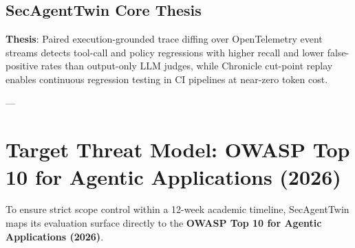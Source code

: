\documentclass[11pt,a4paper]{article}
\begin{document}
\subsection{SecAgentTwin Core Thesis}
\textbf{Thesis}: Paired execution-grounded trace diffing over OpenTelemetry event streams detects tool-call and policy regressions with higher recall and lower false-positive rates than output-only LLM judges, while Chronicle cut-point replay enables continuous regression testing in CI pipelines at near-zero token cost.

---

\section{Target Threat Model: OWASP Top 10 for Agentic Applications (2026)}

To ensure strict scope control within a 12-week academic timeline, SecAgentTwin maps its evaluation surface directly to the \textbf{OWASP Top 10 for Agentic Applications (2026)}.
\end{document}
